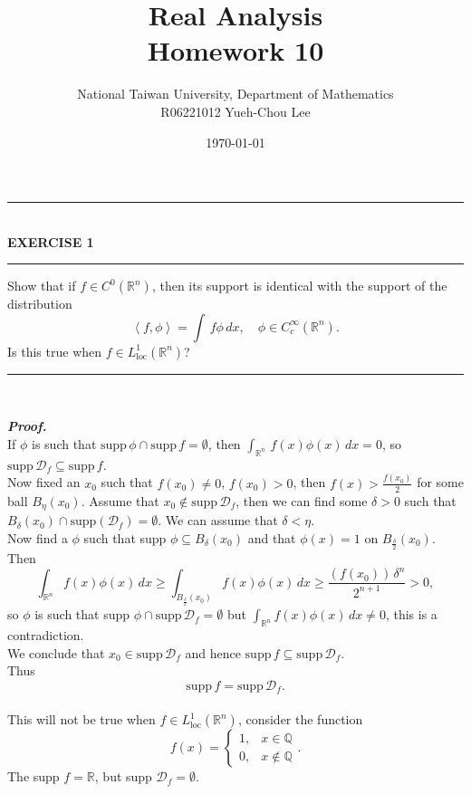 \documentclass[a4paper,11pt]{article}
\title{Real Analysis\\ Homework 10}
\author{National Taiwan University, Department of Mathematics\\
R06221012 \hspace{0.2cm} Yueh-Chou Lee}
\date{\today}
\begin{document}
\maketitle

	\begin{flushleft}
		\rule[-0.5ex]{17cm}{2pt}\\
			\textbf{EXERCISE 1}\\
		\rule[1.5ex]{17cm}{0.5pt}
			Show that if $f \in C^0(\mathbb{R}^n)$, then its support is identical with the support of the distribution
				$$\left<f,\phi\right>
				= \int\,f\phi\,dx, \quad \phi \in C_c^\infty(\mathbb{R}^n).$$
			Is this true when $f \in L_{\text{loc}}^1(\mathbb{R}^n)$?
		\rule[1.0ex]{17cm}{0.5pt}\
	\end{flushleft}
	\textbf{\textit{Proof.}}\\
		If $\phi$ is such that $\text{supp}\,\phi\cap\text{supp}\,f = \emptyset$, then $\int_{\mathbb{R}^n}\,f(x)\phi(x)\,dx = 0$, so $\text{supp}\,\mathcal{D}_f \subseteq \text{supp}\,f$.\\
		Now fixed an $x_0$ such that $f(x_0) \neq 0$, $f(x_0) > 0$, then $f(x) > \frac{f(x_0)}{2}$ for some ball $B_\eta(x_0)$. Assume that $x_0 \notin \text{supp}\,\mathcal{D}_f$, then we can find some $\delta > 0$ such that $B_\delta(x_0) \cap \text{supp}(\mathcal{D}_f) = \emptyset$. We can assume that $\delta < \eta$.\\
		Now find a $\phi$ such that supp $\phi \subseteq B_\delta(x_0)$ and that $\phi(x) = 1$ on $B_{\frac{\delta}{2}}(x_0)$. Then
			$$\int_{\mathbb{R}^n} f(x)\phi(x)\,dx
			\geq \int_{B_{\frac{\delta}{2}}(x_0)} f(x) \phi(x)\,dx
			\geq \frac{(f(x_0))\,\delta^n}{2^{n+1}} > 0,$$
		so $\phi$ is such that supp $\phi \cap \text{supp}\,\mathcal{D}_f = \emptyset$ but $\int_{\mathbb{R}^n} f(x)\phi(x)\,dx \neq 0$, this is a contradiction.\\
		We conclude that $x_0 \in \text{supp}\,\mathcal{D}_f$ and hence $\text{supp}\,f \subseteq \text{supp}\,\mathcal{D}_f$.\\
		Thus
			$$\text{supp}\,f = \text{supp}\,\mathcal{D}_f.$$\\
		This will not be true when $f \in L_{\text{loc}}^1(\mathbb{R}^n)$, consider the function
			$$f(x) =
			\left\{\begin{matrix}
			1, &x \in \mathbb{Q}\\
			0, &x \notin \mathbb{Q}
			\end{matrix}\right..$$
		The supp $f = \mathbb{R}$, but supp $\mathcal{D}_f = \emptyset$.\\
\end{document}
